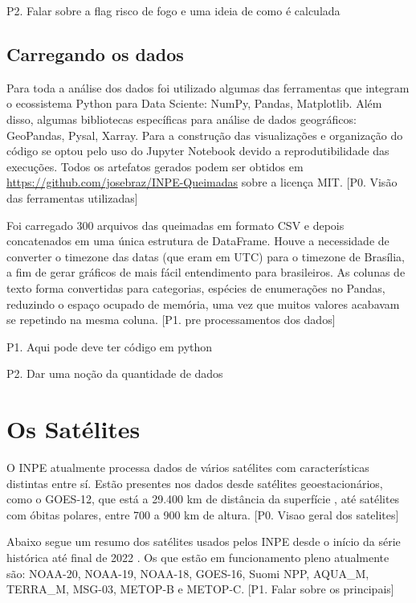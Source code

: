 \documentclass[cic,tc]{iiufrgs}
\begin{document}
P2. Falar sobre a flag risco de fogo e uma ideia de como é calculada \par

\subsection{Carregando os dados} 

Para toda a análise dos dados foi utilizado algumas das ferramentas que integram o 
ecossistema Python para Data Sciente: NumPy, Pandas, Matplotlib. Além disso, 
algumas bibliotecas específicas para análise de dados geográficos: GeoPandas, 
Pysal, Xarray. Para a construção das visualizações e organização do código se 
optou pelo uso do Jupyter Notebook devido a reprodutibilidade das execuções. 
Todos os artefatos gerados podem ser obtidos em 
\url{https://github.com/josebraz/INPE-Queimadas} sobre a licença MIT. 
[P0. Visão das ferramentas utilizadas]\par

Foi carregado 300 arquivos das queimadas em formato CSV e depois concatenados
em uma única estrutura de DataFrame. Houve a necessidade de converter o timezone 
das datas (que eram em UTC) para o timezone de Brasília, a fim de gerar gráficos 
de mais fácil entendimento para brasileiros. As colunas de texto forma convertidas 
para categorias, espécies de enumerações no Pandas, reduzindo o espaço ocupado 
de memória, uma vez que muitos valores acabavam se repetindo na mesma coluna. 
[P1. pre processamentos dos dados]\par


P1. Aqui pode deve ter código em python \par
P2. Dar uma noção da quantidade de dados \par

\section{Os Satélites}

O INPE atualmente processa dados de vários satélites com características
distintas entre sí. Estão presentes nos dados desde satélites geoestacionários, 
como o GOES-12, que está a 29.400 km de distância da superfície 
\citep{GOES12Algo}, até satélites com óbitas polares, entre 700 a 900 km de altura.
[P0. Visao geral dos satelites] \par

Abaixo segue um resumo dos satélites usados pelos INPE desde  o início da 
série histórica até final de 2022 \cite{EmbrapaSatelites}. 
Os que estão em funcionamento pleno atualmente são:
NOAA-20, NOAA-19, NOAA-18, GOES-16, Suomi NPP, AQUA\_M, TERRA\_M, MSG-03, 
METOP-B e METOP-C. [P1. Falar sobre os principais]\par
\end{document}

